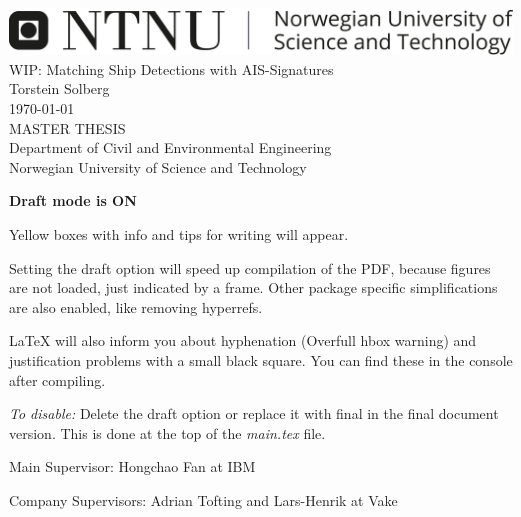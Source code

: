 \thispagestyle{empty}
\includegraphics[scale=0.5]{Figures/ntnu_bredde_eng_svart.png}
\mbox{}\\[6pc]

\Huge{WIP: Matching Ship Detections with AIS-Signatures}\\[2pc]

\Large{Torstein Solberg}\\[1pc]
\large{\monthyeardate\today}\\[2pc]

MASTER THESIS\\
Department of Civil and Environmental Engineering\\
Norwegian University of Science and Technology

\begin{info}
	\textbf{Draft mode is ON}

	Yellow boxes with info and tips for writing will appear.

	Setting the draft option will speed up compilation of the PDF, because figures are not loaded, just indicated by a frame. Other package specific simplifications are also enabled, like removing hyperrefs. 

	LaTeX will also inform you about hyphenation (Overfull hbox warning) and justification problems with a small black square. You can find these in the console after compiling.

	\emph{To disable:} Delete the draft option or replace it with final in the final document version. This is done at the top of the \emph{main.tex} file.
\end{info}

\vfill

\noindent Main Supervisor: Hongchao Fan at IBM

\noindent Company Supervisors: Adrian Tofting and Lars-Henrik at Vake

